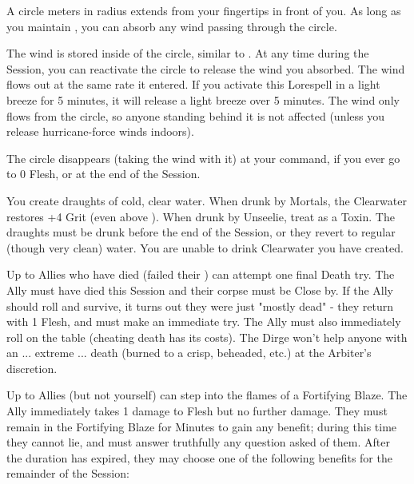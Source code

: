 \begin{multicols*}{2}
A circle \DICE meters in radius extends from your fingertips in front of you. As long as you maintain , you can absorb any wind passing through the circle. 

The wind is stored inside of the circle, similar to . At any time during the Session, you can reactivate the circle to release the wind you absorbed.  The wind flows out at the same rate it entered. If you activate this Lorespell in a light breeze for 5 minutes, it will release a light breeze over 5 minutes. The wind only flows from the circle, so anyone standing behind it is not affected (unless you release hurricane-force winds indoors). 

The circle disappears (taking the wind with it) at your command, if you ever go to 0 Flesh, or at the end of the Session.

\LITURGY [
  Name = Clearwater,
  Link = arcana-mystery-clearwater,
  Paradigm = Heathen,
  Duration = Session
]

You create \DICE draughts of cold, clear water. When drunk by Mortals, the Clearwater restores +4 Grit (even above \MAX). When drunk by Unseelie, treat as a  Toxin. The draughts must be drunk before the end of the Session, or they revert to regular (though very clean) water. You are unable to drink Clearwater you have created.

\LITURGY [
  Name = Dirge,
  Link = arcana-mystery-dirge,
  Paradigm = J{\UmlautO}tnar,
  Duration = Session
]

Up to \DICE Allies who have died (failed their ) can attempt one final Death try. The Ally must have died this Session and their corpse must be Close by. If the Ally should roll and survive, it turns out they were just "mostly dead" - they return with 1 Flesh, and must make an immediate  try. The Ally must also immediately roll on the  table (cheating death has its costs). The Dirge won't help anyone with an ... extreme ... death (burned to a crisp, beheaded, etc.) at the Arbiter's discretion.



\LITURGY [
  Name = Fortifying Blaze,
  Link = arcana-mystery-fortifying-blaze,
  Paradigm = Righteous,
  Duration = Bivouac
]

Up to \DICE Allies (but not yourself) can step into the flames of a Fortifying Blaze. The Ally immediately takes 1 damage to Flesh but no further damage. They must remain in the Fortifying Blaze for Minutes to gain any benefit; during this time they cannot lie, and must answer truthfully any question asked of them.  After the duration has expired, they may choose one of the following benefits for the remainder of the Session:


\end{multicols*}
